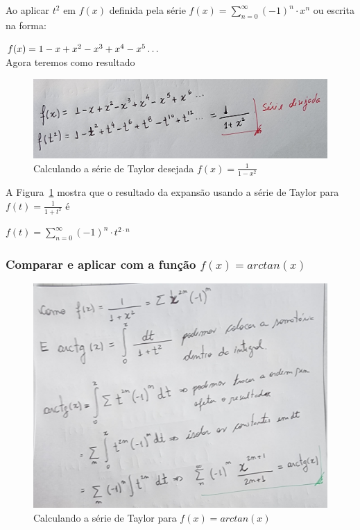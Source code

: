 Ao aplicar $t^2$ em $f(x)$ definida pela série $f(x) = \sum_{n=0}^{\infty} (-1)^n \cdot x^n $ ou escrita na forma:

$f(x) = 1 - x + x^2 - x^3 + x^4 - x^5 \mathellipsis $ \\
Agora teremos como resultado

\begin{figure}[H]
    \centering
    \includegraphics[width=1.0\textwidth]{imagens/exercicio4_parte2}
    \caption{Calculando a série de Taylor desejada $f(x) = \frac{1}{1 - x^2}$}
    \label{fig:exe4_parte2}
\end{figure}

A Figura~\ref{fig:exe4_parte2} mostra que o resultado da expansão usando a série de Taylor para $f(t) = \frac{1}{1 + t^2}$ é

$f(t) = \sum_{n=0}^{\infty} (-1)^n \cdot t^{2 \cdot n}$

\subsubsection{Comparar e aplicar com a função $f(x) = arctan(x)$}

\begin{figure}[H]
    \centering
    \includegraphics[width=.7\textwidth]{imagens/exercicio4_parte3}
    \caption{Calculando a série de Taylor para $f(x) = arctan(x)$}
    \label{fig:exe4_parte3}
\end{figure}


